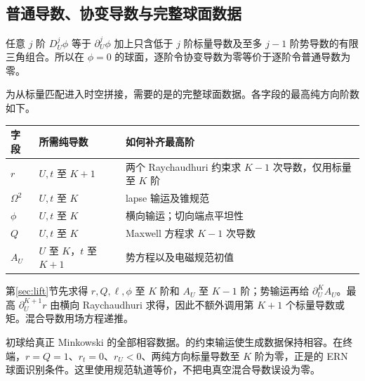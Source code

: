 \subsection{普通导数、协变导数与完整球面数据}\label{sec:data}
任意 $j$ 阶 $D_U^j\phi$ 等于 $\partial_U^j\phi$ 加上只含低于 $j$ 阶标量导数及至多 $j-1$ 阶势导数的有限三角组合。所以在 $\phi=0$ 的球面，逐阶令协变导数为零等价于逐阶令普通导数为零。

为从标量匹配进入时空拼接，需要的是\cite[Definition 2.3]{KU}的完整球面数据。各字段的最高纯方向阶数如下。
\begin{center}\small
\begin{tabular}{p{}p{}p{}}
\toprule 字段 & 所需纯导数 & 如何补齐最高阶\\\midrule
$r$ & $U,t$ 至 $K+1$ & 两个 Raychaudhuri 约束求 $K-1$ 次导数，仅用标量至 $K$ 阶\\
$\Omega^2$ & $U,t$ 至 $K$ & lapse 输运及锥规范\\
$\phi$ & $U,t$ 至 $K$ & 横向输运；切向端点平坦性\\
$Q$ & $U,t$ 至 $K$ & Maxwell 方程求 $K-1$ 次导数\\
$A_U$ & $U$ 至 $K$，$t$ 至 $K+1$ & 势方程以及电磁规范初值\\\bottomrule
\end{tabular}
\end{center}
第\ref{sec:lift}节先求得 $r,Q,\ell,\phi$ 至 $K$ 阶和 $A_U$ 至 $K-1$ 阶；势输运再给 $\partial_U^KA_U$。最高 $\partial_U^{K+1}r$ 由横向 Raychaudhuri 求得，因此不额外调用第 $K+1$ 个标量导数或矩。混合导数用场方程递推。

初球给真正 Minkowski 的全部相容数据。\cite[Proposition 2.3]{KU}的约束输运使生成数据保持相容。在终端，$r=Q=1$、$r_t=0$、$r_U<0$、两纯方向标量导数至 $K$ 阶为零，正是\cite[Lemma 4.2]{KU}的 ERN 球面识别条件。这里使用规范轨道等价，不把电真空混合导数误设为零。

